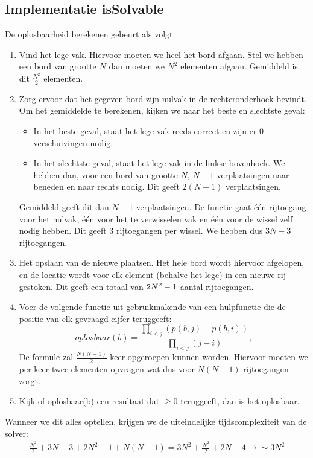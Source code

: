 \documentclass[a4paper]{article}
\numberwithin{equation}{section}
\begin{document}
        \pagebreak

        \subsection{Implementatie isSolvable}
        De oplosbaarheid berekenen gebeurt als volgt:
        \begin{enumerate}
            \item Vind het lege vak. Hiervoor moeten we heel het bord afgaan. Stel we hebben een bord van grootte $N$ dan moeten we $N^2$ elementen afgaan.
            Gemiddeld is dit $\frac{N^2}{2}$ elementen.
            \item Zorg ervoor dat het gegeven bord zijn nulvak in de rechteronderhoek bevindt. Om het gemiddelde te berekenen, kijken we naar het beste en slechtste geval:
            \begin{itemize}
                \item In het beste geval, staat het lege vak reeds correct en zijn er $0$ verschuivingen nodig.
                \item In het slechtste geval, staat het lege vak in de linkse bovenhoek. We hebben dan, voor een bord van grootte $N$, $N - 1$ verplaatsingen naar beneden en naar rechts nodig. Dit geeft $2(N-1)$ verplaatsingen.
            \end{itemize}
            Gemiddeld geeft dit dan $N - 1$ verplaatsingen. De functie gaat \'e\'en rijtoegang voor het nulvak, \'e\'en voor het te verwisselen vak en \'e\'en voor de wissel zelf nodig hebben. Dit geeft $3$ rijtoegangen per wissel. We hebben dus $3N-3$ rijtoegangen.
            \item Het opslaan van de nieuwe plaatsen. Het hele bord wordt hiervoor afgelopen, en de locatie wordt voor elk element (behalve het lege) in een nieuwe rij gestoken.  Dit geeft een totaal van $2N^2 \-- 1$ aantal rijtoegangen.
            \item Voer de volgende functie uit gebruikmakende van een hulpfunctie die de positie van elk gevraagd cijfer teruggeeft:
            \begin{equation}
                oplosbaar(b) = \frac{\prod_{i<j} (p(b, j)-p(b, i))}{\prod_{i<j}(j-i)},
            \end{equation}
            De formule zal $\frac{N(N-1)}{2}$ keer opgeroepen kunnen worden. Hiervoor moeten we per keer twee elementen opvragen wat dus voor $N(N-1)$ rijtoegangen zorgt.  
            \item Kijk of oplosbaar(b) een resultaat dat $\geq 0$ teruggeeft, dan is het oplosbaar.
        \end{enumerate}
        Wanneer we dit alles optellen, krijgen we de uiteindelijke tijdscomplexiteit van de solver:
        \begin{align*}
            \frac{N^2}{2} + 3N -3 + 2N^2 - 1 + N(N-1) = 3N^2 + \frac{N^2}{2} +2N -4 \rightarrow \sim 3N^2
        \end{align*}
        
\end{document}
